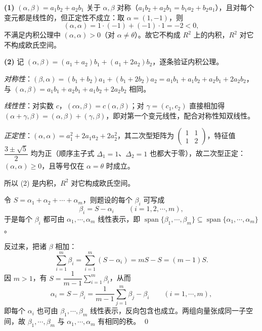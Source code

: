 \begin{solution}
\textbf{(1)} $(\alpha,\beta)=a_1b_2+a_2b_1$ 关于 $\alpha,\beta$ 对称（$a_1b_2+a_2b_1=b_1a_2+b_2a_1$），且对每个变元都是线性的，但正定性不成立：取 $\alpha=(1,-1)$，则
\[
(\alpha,\alpha)=1\cdot(-1)+(-1)\cdot1=-2<0,
\]
不满足内积公理中 $(\alpha,\alpha)>0$（对 $\alpha\ne\theta$）。故它不构成 $R^{2}$ 上的内积，$R^{2}$ 对它不构成欧氏空间。

\textbf{(2)} 记 $(\alpha,\beta)=(a_1+a_2)b_1+(a_1+2a_2)b_2$，逐条验证内积公理。

\emph{对称性}：$( \beta,\alpha)=(b_1+b_2)a_1+(b_1+2b_2)a_2=a_1b_1+a_1b_2+a_2b_1+2a_2b_2$，与 $(\alpha,\beta)=a_1b_1+a_2b_1+a_1b_2+2a_2b_2$ 相同。

\emph{线性性}：对实数 $c$，$(c\alpha,\beta)=c(\alpha,\beta)$；对 $\gamma=(c_1,c_2)$ 直接相加得 $(\alpha+\gamma,\beta)=(\alpha,\beta)+(\gamma,\beta)$，即对第一个变元线性，配合对称性知双线性。

\emph{正定性}：$(\alpha,\alpha)=a_1^{2}+2a_1a_2+2a_2^{2}$，其二次型矩阵为 $\begin{pmatrix}1&1\\1&2\end{pmatrix}$，特征值 $\dfrac{3\pm\sqrt5}{2}$ 均为正（顺序主子式 $\Delta_1=1$、$\Delta_2=1$ 也都大于零），故二次型正定：$(\alpha,\alpha)\ge0$，且等号仅在 $\alpha=\theta$ 时成立。

所以 (2) 是内积，$R^{2}$ 对它构成欧氏空间。
\end{solution}

\begin{solution}
令 $S=\alpha_1+\alpha_2+\cdots+\alpha_m$，则题设的每个 $\beta_i$ 可写成
\[
\beta_i=S-\alpha_i\qquad(i=1,2,\cdots,m),
\]
于是每个 $\beta_i$ 都可由 $\alpha_1,\cdots,\alpha_m$ 线性表示，即 $\operatorname{span}\{\beta_1,\cdots,\beta_m\}\subseteq\operatorname{span}\{\alpha_1,\cdots,\alpha_m\}$。

反过来，把诸 $\beta$ 相加：
\[
\sum_{i=1}^{m}\beta_i=\sum_{i=1}^{m}(S-\alpha_i)=mS-S=(m-1)S .
\]
因 $m>1$，有 $S=\dfrac{1}{m-1}\sum\limits_{i=1}^{m}\beta_i$，从而
\[
\alpha_i=S-\beta_i=\frac{1}{m-1}\sum_{j=1}^{m}\beta_j-\beta_i\qquad(i=1,\cdots,m),
\]
即每个 $\alpha_i$ 也可由 $\beta_1,\cdots,\beta_m$ 线性表示，反向包含也成立。两组向量张成同一子空间，故 $\beta_1,\cdots,\beta_m$ 与 $\alpha_1,\cdots,\alpha_m$ 有相同的秩。
\qed
\end{solution}

